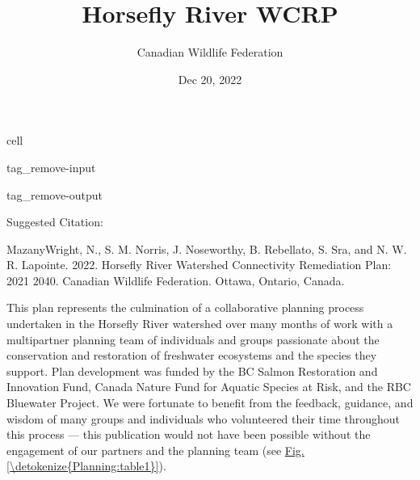 \documentclass[letterpaper,10pt,english]{jupyterBook}
\title{Horsefly River WCRP}
\date{Dec 20, 2022}
\author{Canadian Wildlife Federation}
\begin{document}
\pagestyle{empty}
\sphinxmaketitle
\pagestyle{plain}
\sphinxtableofcontents
\pagestyle{normal}
\label{\detokenize{intro::doc}}
\begin{sphinxuseclass}{cell}
\begin{sphinxuseclass}{tag_remove-input}
\begin{sphinxuseclass}{tag_remove-output}
\end{sphinxuseclass}
\end{sphinxuseclass}
\end{sphinxuseclass}


\sphinxAtStartPar
{}

\sphinxAtStartPar
{}

\sphinxAtStartPar
{}

\sphinxAtStartPar
{}

\sphinxAtStartPar
{}

\sphinxAtStartPar
{}

\sphinxAtStartPar
{}

\sphinxAtStartPar
Suggested Citation:

\sphinxAtStartPar
Mazany\sphinxhyphen{}Wright, N., S. M. Norris, J. Noseworthy, B. Rebellato, S. Sra, and N. W. R. Lapointe. 2022. Horsefly River Watershed Connectivity Remediation Plan: 2021\sphinxhyphen{} 2040. Canadian Wildlife Federation. Ottawa, Ontario, Canada.

\sphinxAtStartPar
{}

\begin{DUlineblock}{0em}
\item[] 
\end{DUlineblock}

\sphinxAtStartPar
This plan represents the culmination of a collaborative planning process undertaken in the Horsefly River watershed over many months of work with a multi\sphinxhyphen{}partner planning team of individuals and groups passionate about the conservation and restoration of freshwater ecosystems and the species they support. Plan development was funded by the BC Salmon Restoration and Innovation Fund, Canada Nature Fund for Aquatic Species at Risk, and the RBC Bluewater Project. We were fortunate to benefit from the feedback, guidance, and wisdom of many groups and individuals who volunteered their time throughout this process — this publication would not have been possible without the engagement of our partners and the planning team (see \hyperref[\detokenize{Planning:table1}]{Fig.\@ \ref{\detokenize{Planning:table1}}}).
\end{document}

